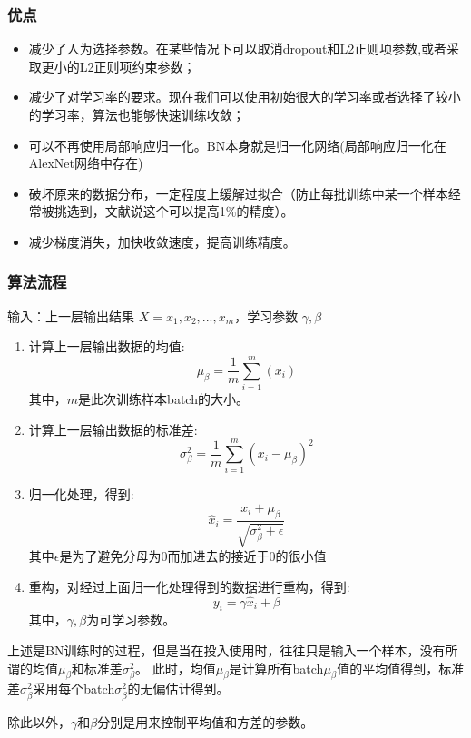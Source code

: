 \documentclass[UTF8]{ctexart}
\begin{document}
\subsubsection{优点}
\begin{itemize}
	\item 减少了人为选择参数。在某些情况下可以取消dropout和L2正则项参数,或者采取更小的L2正则项约束参数；
	\item 减少了对学习率的要求。现在我们可以使用初始很大的学习率或者选择了较小的学习率，算法也能够快速训练收敛；
	\item 可以不再使用局部响应归一化。BN本身就是归一化网络(局部响应归一化在AlexNet网络中存在) 
	\item 破坏原来的数据分布，一定程度上缓解过拟合（防止每批训练中某一个样本经常被挑选到，文献说这个可以提高1\%的精度）。 
	\item 减少梯度消失，加快收敛速度，提高训练精度。
\end{itemize}
\subsubsection{算法流程}
输入：上一层输出结果 $ X = {x_1, x_2, ..., x_m} $，学习参数 $ \gamma, \beta $
\begin{enumerate}
	\item 计算上一层输出数据的均值: $$\mu_{\beta} = \frac{1}{m} \sum_{i=1}^m(x_i)$$ 其中，$ m $是此次训练样本batch的大小。
	\item 计算上一层输出数据的标准差: $$\sigma_{\beta}^2 = \frac{1}{m} \sum_{i=1}^m (x_i - \mu_{\beta})^2$$ 
	\item 归一化处理，得到: $$\hat x_i = \frac{x_i + \mu_{\beta}}{\sqrt{\sigma_{\beta}^2 + \epsilon}}$$ 其中$ \epsilon $是为了避免分母为0而加进去的接近于0的很小值
	\item 重构，对经过上面归一化处理得到的数据进行重构，得到: $$y_i = \gamma \hat x_i + \beta$$  其中，$ \gamma, \beta $为可学习参数。
\end{enumerate}
\par 上述是BN训练时的过程，但是当在投入使用时，往往只是输入一个样本，没有所谓的均值$ \mu_{\beta} $和标准差$ \sigma_{\beta}^2 $。
此时，均值$ \mu_{\beta} $是计算所有batch$ \mu_{\beta} $值的平均值得到，标准差$ \sigma_{\beta}^2 $采用每个batch$ \sigma_{\beta}^2 $的无偏估计得到。
\par 除此以外，$\gamma$和$\beta$分别是用来控制平均值和方差的参数。
\end{document}
